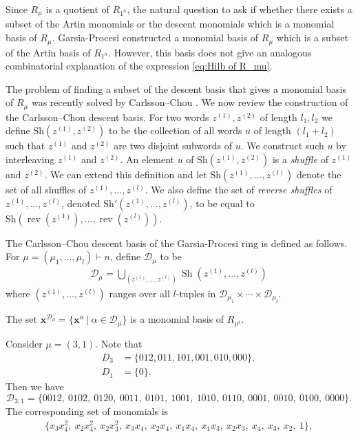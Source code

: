 \documentclass[ALCO, Unicode]{cedram}
\DeclareMathOperator{\sh}{Sh}
\DeclareMathOperator{\rev}{rev}
\begin{document}
Since $R_\mu$  is a quotient of $R_{1^n}$, the natural question to ask if whether there exists a subset of the Artin monomials or the descent monomials which is a monomial basis of $R_\mu$.
Garsia-Procesi \cite{GP} constructed a monomial basis of $R_\mu$  which is a subset of the Artin basis of $R_{1^n}$. However, this basis does not give an analogous combinatorial explanation of the expression \eqref{eq:Hilb of R_mu}.

The problem of finding a subset of the descent basis that gives a monomial basis of $R_\mu$ was recently solved by Carlsson--Chou \cite{CC}.
We now review the construction of the Carlsson--Chou descent basis. 
For two words $z^{(1)},z^{(2)}$ of length $l_1, l_2$ we define $\text{Sh}(z^{(1)},z^{(2)})$ to be the collection of all words $u$ of length $(l_1+l_2)$ such that $z^{(1)}$ and $z^{(2)}$ are two disjoint subwords of $u$.
We construct such $u$ by interleaving $z^{(1)}$ and  $z^{(2)}$. An element $u$ of $\text{Sh}( z^{(1)},z^{(2)})$ is a \textit{shuffle} of $z^{(1)}$ and $z^{(2)}$. We can extend this definition and let $\text{Sh}(z^{(1)},\dots , z^{(l)})$ denote the set of all shuffles of $z^{(1)},\dots , z^{(l)}$.
We also define the set of \textit{reverse shuffles}  of  $z^{(1)},\dots , z^{(l)}$, denoted $\text{Sh}'(z^{(1)},\dots , z^{(l)})$, to be equal to $\text{Sh}(\rev (z^{(1)}),\dots , \rev(z^{(l)}))$.

The Carlsson--Chou descent basis of the Garsia-Procesi ring is defined as follows. 
For $\mu = (\mu_1,\dots,\mu_l) \vdash n$, define $\mathcal{D}_\mu$ to be
\begin{align}
    \mathcal{D}_\mu = \bigcup_{(z^{(1)},\dots , z^{(l)})} \sh (z^{(1)},\dots , z^{(l)})
\end{align}
where $(z^{(1)},\dots , z^{(l)})$ ranges over all $l$-tuples in $\mathcal{D}_{\mu_1}\times \cdots \times \mathcal{D}_{\mu_l}$.

\begin{thm}
The set $\mathbf{x}^{\mathcal{D}_\mu} = \{\mathbf{x}^\alpha \ | \ \alpha \in  \mathcal{D}_\mu\}$  is a monomial basis of $R_{\mu^t}$. 
\end{thm}   

\begin{ex}\label{ex: 31}
    Consider $\mu = (3,1).$ Note that 
    \begin{align*}
        D_3 &= \{012,011, 101, 001,010, 000\},\\
        D_1 &= \{0\}.
    \end{align*}
  Then we have 
  \[\mathcal{D}_{3,1}  = \{0012,\ 0102,\ 0120, \ 0011, \ 0101, \ 1001, \ 1010, \ 0110,\  0001,\ 0010,\ 0100, \ 0000\} .\]
  The corresponding set of monomials is  
  \begin{align*}
       \{x_3x_4^2,
  \ x_2x_4^2, \ x_2x_3^2, \ x_3x_4 ,\  x_2x_4, \ x_1x_4, \ x_1x_3, \ x_2x_3, \ x_4, \ x_3 , \ x_2, \ 1\},
  \end{align*}
\end{ex}
\end{document}
